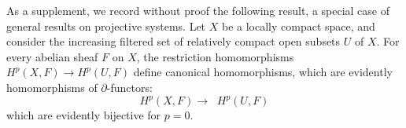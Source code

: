 As a supplement, we record without proof the following result, a special case
of general results on projective systems. Let $X$ be a locally compact space,
and consider the increasing filtered set of relatively compact open subsets
$U$ of $X$. For every abelian sheaf $F$ on $X$, the restriction homomorphisms
$H^p(X,F)\to H^p(U,F)$ define canonical homomorphisms, which are
evidently homomorphisms of $\partial$-functors:
\[
\tag{3.10.2}
H^p(X,F)\to\mathop{\underset{\leftarrow}{\lim}} H^p(U,F)
\]
which are evidently bijective for $p=0$.

